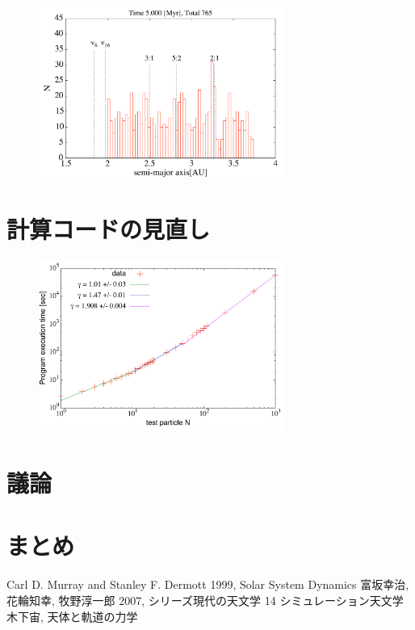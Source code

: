 \documentclass[11pt,a4paper,oneside,onecolumn]{jreport}
\begin{document}
\begin{figure}[H]
\centering
\includegraphics[width=8cm]{./image/asteroid_histogram_5Myr.pdf}
\caption{\label{}}
\end{figure}




\section{計算コードの見直し}
\begin{figure}[H]
\centering
\includegraphics[width=8cm]{./image/Nbody_test.pdf}
\caption{\label{}}
\end{figure}

\section{議論}

\section{まとめ}

\begin{thebibliography}{9}
   Carl D. Murray and Stanley F. Dermott 1999, Solar System Dynamics
   富坂幸治, 花輪知幸, 牧野淳一郎 2007, シリーズ現代の天文学 14 シミュレーション天文学
   木下宙, 天体と軌道の力学
\end{thebibliography}
\end{document}
